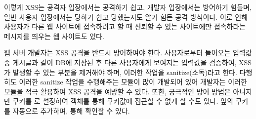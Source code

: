 이렇게 XSS는 공격자 입장에서는 공격하기 쉽고, 개발자 입장에서는 방어하기 힘들며, 일반 사용자 입장에서는 당하기 쉽고 당했는지도 알기 힘든 공격 방식이다. 이로 인해 사용자가 다른 웹 사이트에 접속하려고 할 때 신뢰할 수 있는 사이트에만 접속하라는 메시지를 띄우는 웹 사이트도 있다.

웹 서버 개발자는 XSS 공격을 반드시 방어하여야 한다. 사용자로부터 들어오는 입력값 중 게시글과 같이 DB에 저장된 후 다른 사용자에게 보여지는 입력값을 검증하여, XSS가 발생할 수 있는 부분을 제거해야 하며, 이러한 작업을 sanitize(소독)라고 한다. 다행히도 이러한 sanitize 작업을 수행해주는 모듈이 많이 개발되어 있어 개발자는 이러한 모듈을 적극 활용하여 XSS 공격을 예방할 수 있다. 또한, 궁극적인 방어 방법은 아니지만 쿠키를 로 설정하여  객체를 통해 쿠키값에 접근할 수 없게 할 수도 있다. 앞의 \는  쿠키를 자동으로 추가하며, \과 \를 통해 확인할 수 있다.
